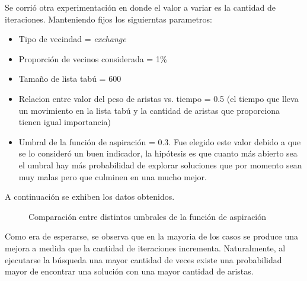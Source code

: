 Se corrió otra experimentación en donde el valor a variar es la cantidad de iteraciones. Manteniendo fijos los siguierntas parametros:

\begin{itemize}
\item Tipo de vecindad = \textit{exchange}
\item Proporción de vecinos considerada = 1\%
\item Tamaño de lista tabú = 600
\item Relacion entre valor del peso de aristas vs. tiempo = 0.5 (el tiempo que
lleva un movimiento en la lista tabú y la cantidad de aristas que proporciona
tienen igual importancia)
\item Umbral de la función de aspiración = 0.3. Fue elegido este valor debido
a que se lo consideró un buen indicador, la hipótesis es que cuanto más
abierto sea el umbral hay más probabilidad de explorar soluciones que por
momento sean muy malas pero que culminen en una mucho mejor.
\end{itemize}

A continuación se exhiben los datos obtenidos.

\begin{figure}[H]
    \centering
    \caption{Comparación entre distintos umbrales de la función de aspiración}
    \pgfplotstabletypeset[
        columns={0, solutions, localsearch, lowiterationlowaspiration, highiterationlowaspiration, nolimititerationlowaspiration}
    ]{\optimalsolutions}
\end{figure}

Como era de esperarse, se observa que en la mayoria de los casos se produce
una mejora a medida que la cantidad de iteraciones incrementa. Naturalmente,
al ejecutarse la búsqueda una mayor cantidad de veces existe una probabilidad
mayor de encontrar una solución con una mayor cantidad de aristas.